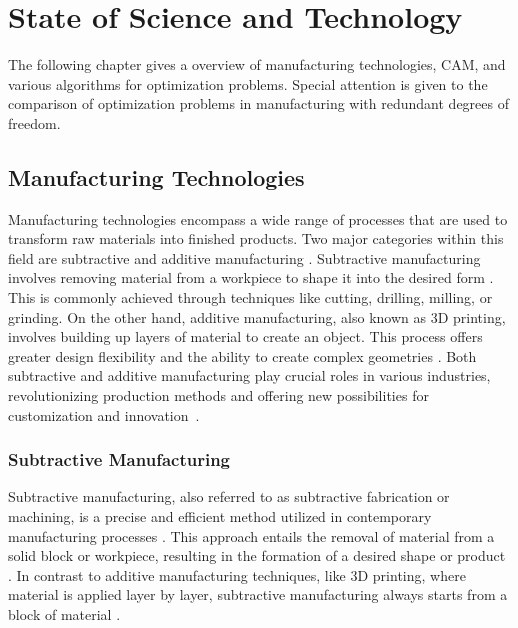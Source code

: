 \chapter{State of Science and Technology}%
The following chapter gives a overview of manufacturing technologies, CAM, and various algorithms for optimization problems. Special attention is given to the comparison of optimization problems in manufacturing with redundant degrees of freedom. 
\section{Manufacturing Technologies}
Manufacturing technologies encompass a wide range of processes that are used to transform raw materials into finished products. Two major categories within this field are subtractive and additive manufacturing \cite{Iqbal.2020}. Subtractive manufacturing involves removing material from a workpiece to shape it into the desired form \cite{Watson.2015}. This is commonly achieved through techniques like cutting, drilling, milling, or grinding. On the other hand, additive manufacturing, also known as 3D printing, involves building up layers of material to create an object. This process offers greater design flexibility and the ability to create complex geometries \cite{Dilberoglu.2017}. Both subtractive and additive manufacturing play crucial roles in various industries, revolutionizing production methods and offering new possibilities for customization and innovation~\cite{Bandyopadhyay.2020, vanLe.2017}.











\subsection{Subtractive Manufacturing}
Subtractive manufacturing, also referred to as subtractive fabrication or machining, is a precise and efficient method utilized in contemporary manufacturing processes \cite{Wang.2023}. This approach entails the removal of material from a solid block or workpiece, resulting in the formation of a desired shape or product \cite{Calleja.2018}. In contrast to additive manufacturing techniques, like 3D printing, where material is applied layer by layer, subtractive manufacturing always starts from a block of material \cite{Abdulhameed.2019}.


